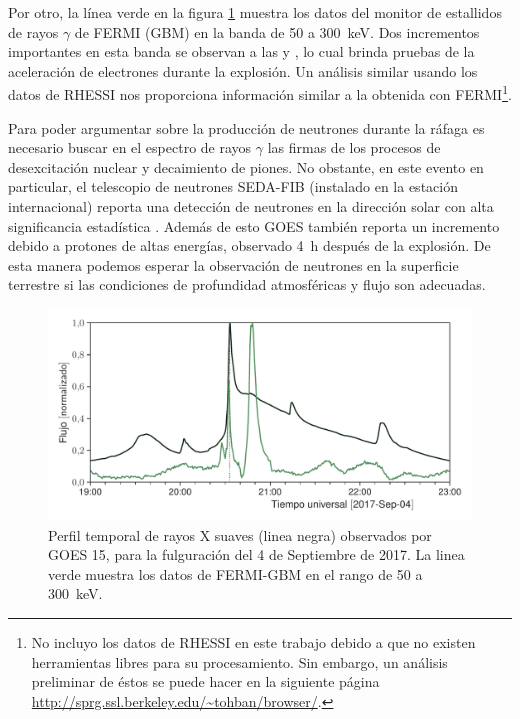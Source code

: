 Por otro, la línea verde en la figura \ref{fig:september-04-xrays} muestra los datos del monitor de estallidos de rayos $\gamma$ de FERMI (GBM) en la banda de \num{50} a \SI{300}{\kilo\electronvolt}. Dos incrementos importantes en esta banda se observan a las  y , lo cual brinda pruebas de la aceleración de electrones durante la explosión. Un análisis similar usando los datos de RHESSI \cite{rhessidata} nos proporciona información similar a la obtenida con FERMI\footnote{No incluyo los datos de RHESSI en este trabajo debido a que no existen herramientas libres para su procesamiento. Sin embargo, un análisis preliminar de éstos se puede hacer en la siguiente página \url{http://sprg.ssl.berkeley.edu/~tohban/browser/}.}.

Para poder argumentar sobre la producción de neutrones durante la ráfaga es necesario buscar en el espectro de rayos $\gamma$ las firmas de los procesos de desexcitación nuclear y decaimiento de piones. No obstante, en este evento en particular, el telescopio de neutrones SEDA-FIB (instalado en la estación internacional) reporta una detección de neutrones en la dirección solar con alta significancia estadística \cite{kamiya19}. Además de esto GOES también reporta un incremento debido a protones de altas energías, observado \SI{4}{\hour} después de la explosión. De esta manera podemos esperar la observación de neutrones en la superficie terrestre si las condiciones de profundidad atmosféricas y flujo son adecuadas.

\begin{figure}
        \centering
        \includegraphics[width=\textwidth]{xrays_170904.pdf}
        \caption{Perfil temporal de rayos X suaves (linea negra) observados por GOES 15, para la fulguración del \num{4} de Septiembre de \num{2017}. La linea verde muestra los datos de FERMI-GBM en el rango de \num{50} a \SI{300}{\kilo\electronvolt}.}
        \label{fig:september-04-xrays}
\end{figure}

